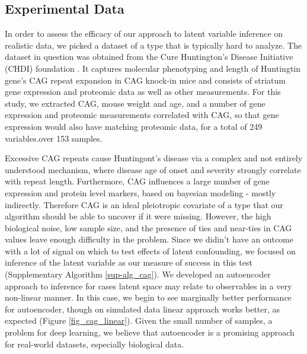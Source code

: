 \documentclass[letterpaper]{article}
\begin{document}
\subsection{Experimental Data}
In order to assess the efficacy of our approach to latent variable inference on realistic data, we picked a dataset of a type that is typically hard to analyze.  The dataset in question was obtained from the Cure Huntington's Disease Initiative (CHDI) foundation \cite{langfelder_integrated_2016}.  It captures molecular phenotyping and length of Huntingtin gene's CAG repeat expansion in CAG knock-in mice and consists of striatum gene expression and proteomic data as well as other measurements.  For this study, we extracted CAG, mouse weight and age, and a number of gene expression and proteomic measurements correlated with CAG, so that gene expression would also have matching proteomic data, for a total of 249 variables.over 153 samples. 

Excessive CAG repeats cause Huntingont's disease via a complex and not entirely understood mechanism, where disease age of onset and severity strongly correlate with repeat length.  Furthermore, CAG influences a large number of gene expression and protein level markers, based on bayesian modeling - mostly indirectly.  Therefore CAG is an ideal pleiotropic covariate of a type that our algorithm should be able to uncover if it were missing.  However, the high biological noise, low sample size, and the presence of ties and near-ties in CAG values leave enough difficulty in the problem.  Since we didin't have an outcome with a lot of signal on which to test effects of latent confounding, we focused on inference of the latent variable as our measure of success in this test (Supplementary Algorithm \ref{sup-alg_cag}).  We developed an autoencoder approach to inference for cases latent space may relate to observables in a very non-linear manner.  In this case, we begin to see marginally better performance for autoencoder, though on simulated data linear approach works better, as expected (Figure \ref{fig_cag_linear}).  Given the small number of samples, a problem for deep learning, we believe that autoencoder is a promising approach for real-world datasets, especially biological data.
\end{document}
